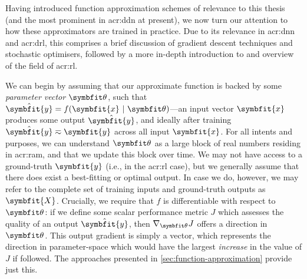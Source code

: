 Having introduced function approximation schemes of relevance to this thesis (and the most prominent in \gls{acr:ddn} at present), we now turn our attention to how these approximators are trained in practice.
Due to its relevance in \gls{acr:dnn} and \gls{acr:drl}, this comprises a brief discussion of gradient descent techniques and stochastic optimisers, followed by a more in-depth introduction to and overview of the field of \gls{acr:rl}.

We can begin by assuming that our approximate function is backed by some \emph{parameter vector} $\wvec{}$, such that $\hat{\symbfit{y}} = f{\left(\symbfit{x}~|~\wvec{}\right)}$---an input vector $\symbfit{x}$ produces some output $\hat{\symbfit{y}}$, and ideally after training $\hat{\symbfit{y}}\eqsim\symbfit{y}$ across all input $\symbfit{x}$.
For all intents and purposes, we can understand $\wvec{}$ as a large block of real numbers residing in \gls{acr:ram}, and that we update this block over time.
We may not have access to a ground-truth $\symbfit{y}$ (i.e., in the \gls{acr:rl} case), but we generally assume that there does exist a best-fitting or optimal output.
In case we do, however, we may refer to the complete set of training inputs and ground-truth outputs as $\symbfit{X}$.
Crucially, we require that $f$ is differentiable with respect to $\wvec{}$: if we define some scalar performance metric $J$ which assesses the quality of an output $\hat{\symbfit{y}}$, then $\nabla_{\wvec{}}{J}$ offers a direction in $\wvec{}$.
This output gradient is simply a vector, which represents the direction in parameter-space which  would have the largest \emph{increase} in the value of $J$ if followed.
The approaches presented in \cref{sec:function-approximation} provide just this.

